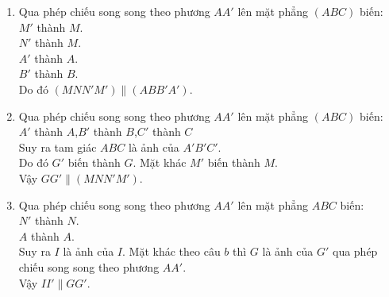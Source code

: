 \begin{vd}
{\begin{center}
			\end{center}
			\begin{enumerate}
				\item  Qua phép chiếu song song theo phương $AA'$ lên mặt phẳng $(ABC)$ biến:\\
				$M'$ thành $M$.\\
				$N'$ thành $M$.\\
				$A'$ thành $A$.\\
				$B'$ thành $B$.\\
				Do đó $(MNN'M')\parallel (ABB'A')$.
				\item Qua phép chiếu song song theo phương $AA'$ lên mặt phẳng $(ABC)$ biến:\\
				$A'$ thành $A$,$B'$ thành $B$,$C'$ thành $C$\\
				Suy ra tam giác $ABC$ là ảnh của $A'B'C'$.\\
				Do đó $G'$ biến thành $G$.
				Mặt khác $M'$ biến thành $M$.\\
				Vậy $GG'\parallel (MNN'M')$.
				\item Qua phép chiếu song song theo phương $AA'$ lên mặt phẳng $ABC$ biến:\\
				$N'$ thành $N$.\\
				$A$ thành $A$.\\
				Suy ra $I$ là ảnh của $I$.
				Mặt khác theo câu $b$ thì $G$ là ảnh của $G'$ qua phép chiếu song song theo phương $AA'$.\\
				Vậy $II'\parallel GG'$.
			\end{enumerate}
		}
	\end{vd}
